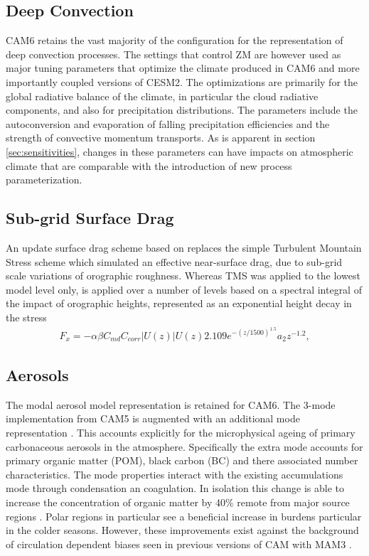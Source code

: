 \subsection{Deep Convection}
CAM6 retains the vast majority of the \cite{Zhang1995} configuration for the representation of deep convection processes.  The settings that control ZM are however used as major tuning parameters that optimize the climate produced in CAM6 and more importantly coupled versions of CESM2. The optimizations are primarily for the global radiative balance of the climate, in particular the cloud radiative components, and also for precipitation distributions. The parameters include the autoconversion and evaporation of falling precipitation efficiencies and the strength of convective momentum transports. As is apparent in section \ref{sec:sensitivities}, changes in these parameters can have impacts on atmospheric climate that are comparable with the introduction of new process parameterization.

\subsection{Sub-grid Surface Drag}
An update surface drag scheme based on \cite{Beljaars2004} replaces the simple Turbulent Mountain Stress \cite[TMS, ][]{Richter2010} scheme which simulated an effective near-surface drag, due to sub-grid scale variations of orographic roughness. Whereas TMS was applied to the lowest model level only, \cite{Beljaars2004} is applied over a number of levels based on a spectral integral of the impact of orographic heights, represented as an exponential height decay in the stress
\begin{eqnarray}
  F_x=-\alpha\beta C_{md} C_{corr}|U(z)|U(z)2.109e^{-(z/1500)^{1.5}}a_2z^{-1.2}, 
\end{eqnarray}

\subsection{Aerosols}
The modal aerosol model representation is retained for CAM6. The 3-mode implementation from CAM5 \citep[MAM3, ][]{Liu2012} is augmented with an additional mode representation \citep{Liu2016}. This accounts explicitly for the microphysical ageing of primary carbonaceous aerosols in the atmosphere. Specifically the extra mode accounts for primary organic matter (POM), black carbon (BC) and there associated number characteristics. The mode properties interact with the existing accumulations mode through condensation an coagulation. In isolation this change is able to increase the concentration of organic matter by 40\% remote from major source regions \citep{Liu2016}. Polar regions in particular see a beneficial increase in burdens particular in the colder seasons. However, these improvements exist against the background of circulation dependent biases seen in previous versions of CAM with MAM3 \citep{Ma2013}.


